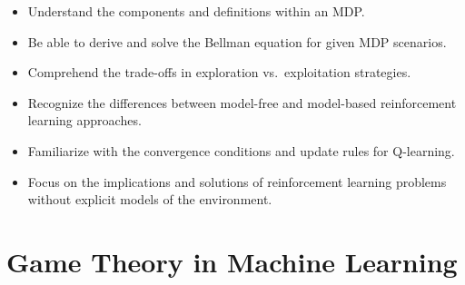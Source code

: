 \documentclass[
  12pt,
]{report}
\providecommand{\tightlist}{%
  \setlength{\itemsep}{0pt}\setlength{\parskip}{0pt}}
\begin{document}
\begin{enumerate}
  \begin{itemize}
  \tightlist
  \item
    Understand the components and definitions within an MDP.
  \item
    Be able to derive and solve the Bellman equation for given MDP scenarios.
  \item
    Comprehend the trade-offs in exploration vs.~exploitation strategies.
  \item
    Recognize the differences between model-free and model-based reinforcement learning approaches.
  \item
    Familiarize with the convergence conditions and update rules for Q-learning.
  \item
    Focus on the implications and solutions of reinforcement learning problems without explicit models of the environment.
  \end{itemize}
\end{enumerate}

\chapter{Game Theory in Machine Learning}
\end{document}
